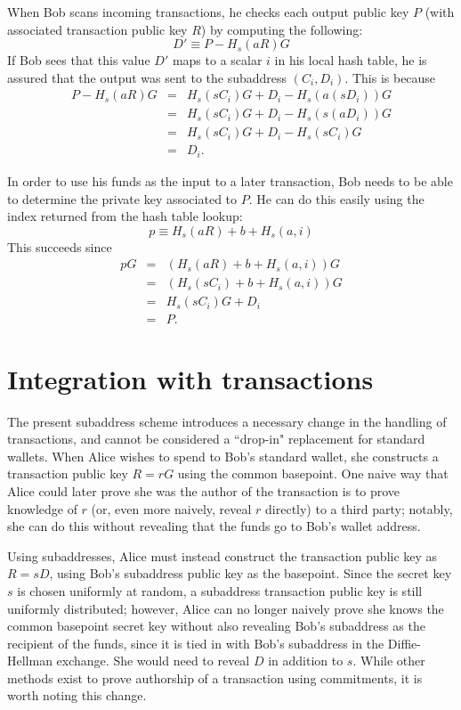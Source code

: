\documentclass{mrl}
\begin{document}
When Bob scans incoming transactions, he checks each output public key $P$ (with associated transaction public key $R$) by computing the following:
$$D' \equiv P - H_s(aR)G$$
If Bob sees that this value $D'$ maps to a scalar $i$ in his local hash table, he is assured that the output was sent to the subaddress $(C_i,D_i)$. This is because
\begin{eqnarray*}
P - H_s(aR)G &=& H_s(sC_i)G + D_i - H_s(a(sD_i))G \\
&=& H_s(sC_i)G + D_i - H_s(s(aD_i))G \\
&=& H_s(sC_i)G + D_i - H_s(sC_i)G \\
&=& D_i.
\end{eqnarray*}

In order to use his funds as the input to a later transaction, Bob needs to be able to determine the private key associated to $P$. He can do this easily using the index returned from the hash table lookup:
$$p \equiv H_s(aR) + b + H_s(a,i)$$
This succeeds since
\begin{eqnarray*}
pG &=& (H_s(aR) + b + H_s(a,i))G \\
&=& (H_s(sC_i) + b + H_s(a,i))G \\
&=& H_s(sC_i)G + D_i \\
&=& P.
\end{eqnarray*}


\section{Integration with transactions}
The present subaddress scheme introduces a necessary change in the handling of transactions, and cannot be considered a ``drop-in" replacement for standard wallets. When Alice wishes to spend to Bob's standard wallet, she constructs a transaction public key $R = rG$ using the common basepoint. One naive way that Alice could later prove she was the author of the transaction is to prove knowledge of $r$ (or, even more naively, reveal $r$ directly) to a third party; notably, she can do this without revealing that the funds go to Bob's wallet address.

Using subaddresses, Alice must instead construct the transaction public key as $R = sD$, using Bob's subaddress public key as the basepoint. Since the secret key $s$ is chosen uniformly at random, a subaddress transaction public key is still uniformly distributed; however, Alice can no longer naively prove she knows the common basepoint secret key without also revealing Bob's subaddress as the recipient of the funds, since it is tied in with Bob's subaddress in the Diffie-Hellman exchange. She would need to reveal $D$ in addition to $s$. While other methods exist to prove authorship of a transaction using commitments, it is worth noting this change.
\end{document}
